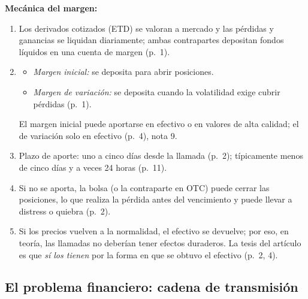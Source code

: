 \documentclass{article} %
\newcommand{\pg}[1]{(p.~#1)}
\begin{document}
        \textbf{Mecánica del margen:}
        \begin{enumerate}
            \item Los derivados cotizados (ETD) se valoran a mercado y las pérdidas y ganancias se liquidan diariamente; ambas contrapartes depositan fondos líquidos en una cuenta de margen \pg{1}.
            \item \begin{itemize}
                \item \emph{Margen inicial:} se deposita para abrir posiciones. 
                \item \emph{Margen de variación:} se deposita cuando la volatilidad exige cubrir pérdidas \pg{1}. 
            \end{itemize}
            El margen inicial puede aportarse en efectivo o en valores de alta calidad; el de variación solo en efectivo \pg{4}, nota 9.
            \item Plazo de aporte: uno a cinco días desde la llamada \pg{2}; típicamente menos de cinco días y a veces 24 horas \pg{11}.
            \item Si no se aporta, la bolsa (o la contraparte en OTC) puede cerrar las posiciones, lo que realiza la pérdida antes del vencimiento y puede llevar a distress o quiebra \pg{2}.
            \item Si los precios vuelven a la normalidad, el efectivo se devuelve; por eso, en teoría, las llamadas no deberían tener efectos duraderos. La tesis del artículo es que \emph{sí los tienen} por la forma en que se obtuvo el efectivo \pg{2, 4}.
        \end{enumerate}

    \subsection{El problema financiero: cadena de transmisión}
\end{document}
